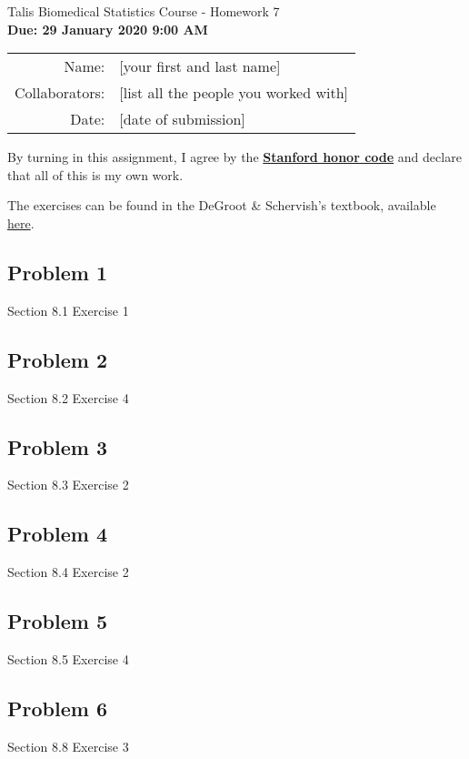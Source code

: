 \documentclass[12pt]{article}\usepackage[]{graphicx}\usepackage[]{color}
\begin{document}
\begin{center}
{\Large Talis Biomedical Statistics Course - Homework 7} \\
{\small \textbf{Due: 29 January 2020 9:00 AM}}
\newline

\begin{tabular}{rl}
  Name: & [your first and last name] \\
  Collaborators: & [list all the people you worked with] \\
  Date: & [date of submission]
\end{tabular}
\end{center}

By turning in this assignment, I agree by the \textbf{\href{https://communitystandards.stanford.edu/policies-and-guidance/honor-code}{Stanford honor code}} and declare
that all of this is my own work. \\

\vspace{.2in}

The exercises can be found in the DeGroot \& Schervish's textbook, available
\textcolor{blue}{\href{http://professor.ufabc.edu.br/~nelson.faustino/Ensino/IPE2016/Livros/Morris\%20H\%20DeGroot_\%20Mark\%20J\%20Schervish-Probability\%20and\%20statistics-Pearson\%20Education\%20\%20(2012)\%20(1).pdf}{here}}.


\subsection*{Problem 1}

Section 8.1 Exercise 1 \\


\subsection*{Problem 2}

Section 8.2 Exercise 4 \\


\subsection*{Problem 3}

Section 8.3 Exercise 2 \\


\subsection*{Problem 4}

Section 8.4 Exercise 2 \\


\subsection*{Problem 5}

Section 8.5 Exercise 4 \\


\subsection*{Problem 6}

Section 8.8 Exercise 3 \\
\end{document}
